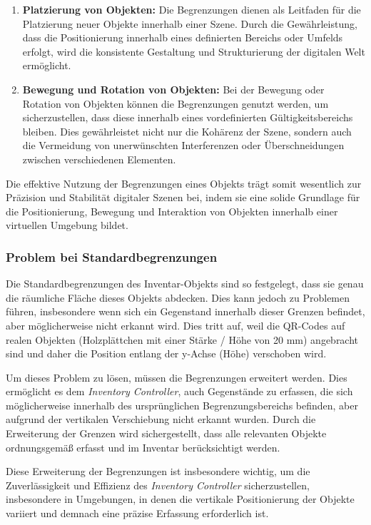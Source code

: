 \begin{itemize}
\begin{enumerate}
    \item \textbf{Platzierung von Objekten:} Die Begrenzungen dienen als Leitfaden für die Platzierung neuer Objekte
    innerhalb einer Szene. Durch die Gewährleistung, dass die Positionierung innerhalb eines definierten Bereichs oder
    Umfelds erfolgt, wird die konsistente Gestaltung und Strukturierung der digitalen Welt ermöglicht.

    \item \textbf{Bewegung und Rotation von Objekten:} Bei der Bewegung oder Rotation von Objekten können die Begrenzungen
    genutzt werden, um sicherzustellen, dass diese innerhalb eines vordefinierten Gültigkeitsbereichs bleiben. Dies
    gewährleistet nicht nur die Kohärenz der Szene, sondern auch die Vermeidung von unerwünschten Interferenzen oder
    Überschneidungen zwischen verschiedenen Elementen.
\end{enumerate}

Die effektive Nutzung der Begrenzungen eines Objekts trägt somit wesentlich zur Präzision und Stabilität digitaler
Szenen bei, indem sie eine solide Grundlage für die Positionierung, Bewegung und Interaktion von Objekten innerhalb
einer virtuellen Umgebung bildet.

\subsubsection{Problem bei Standardbegrenzungen}
Die Standardbegrenzungen des Inventar-Objekts sind so festgelegt, dass sie genau die räumliche Fläche dieses Objekts
abdecken. Dies kann jedoch zu Problemen führen, insbesondere wenn sich ein Gegenstand innerhalb dieser Grenzen befindet,
aber möglicherweise nicht erkannt wird. Dies tritt auf, weil die QR-Codes auf realen Objekten (Holzplättchen mit einer
Stärke / Höhe von 20 mm) angebracht sind und daher die Position entlang der y-Achse (Höhe) verschoben wird.

Um dieses Problem zu lösen, müssen die Begrenzungen erweitert werden. Dies ermöglicht es dem \textit{Inventory Controller},
auch Gegenstände zu erfassen, die sich möglicherweise innerhalb des ursprünglichen Begrenzungsbereichs befinden, aber
aufgrund der vertikalen Verschiebung nicht erkannt wurden. Durch die Erweiterung der Grenzen wird sichergestellt, dass
alle relevanten Objekte ordnungsgemäß erfasst und im Inventar berücksichtigt werden.

Diese Erweiterung der Begrenzungen ist insbesondere wichtig, um die Zuverlässigkeit und Effizienz des \textit{Inventory Controller}
sicherzustellen, insbesondere in Umgebungen, in denen die vertikale Positionierung der Objekte variiert und demnach eine
präzise Erfassung erforderlich ist.


\end{itemize}
